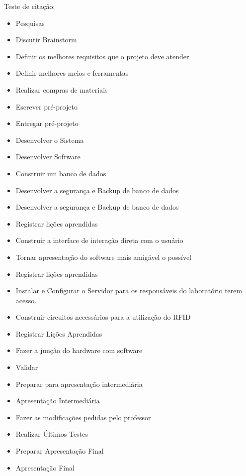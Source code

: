 \vspace{-42pt}
Teste de citação: \cite{DepEngEle}

\begin{itemize}
	\item Pesquisas
	\item Discutir Brainstorm
	\item Definir os melhores requisitos que o projeto deve atender
	\item Definir melhores meios e ferramentas
	\item Realizar compras de materiais
	\item Escrever pré-projeto
	\item Entregar pré-projeto
	\item Desenvolver o Sistema
	\item Desenvolver Software
	\item Construir um banco de dados
	\item Desenvolver a segurança e Backup de banco de dados
	\item Desenvolver a segurança e Backup de banco de dados
	\item Registrar lições aprendidas
	\item Construir a interface de interação direta com o usuário
	\item Tornar apresentação do software mais amigável o possível
	\item Registrar lições aprendidas
	\item Instalar e Configurar o Servidor para os responsáveis do laboratório terem acesso.
	\item Construir circuitos necessários para a utilização do RFID
	\item Registrar Lições Aprendidas
	\item Fazer a junção do hardware com software
	\item Validar
	\item Preparar para apresentação intermediária
	\item Apresentação Intermediária
	\item Fazer as modificações pedidas pelo professor
	\item Realizar Últimos Testes
	\item Preparar Apresentação Final
	\item Apresentação Final
\end{itemize}



